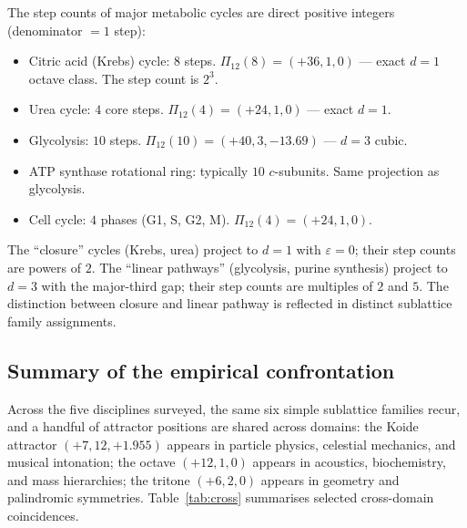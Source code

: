 \documentclass[11pt,a4paper]{article}
\theoremstyle{definition}
\theoremstyle{remark}
\newcommand{\eps}{\varepsilon}
\begin{document}
The step counts of major metabolic cycles are direct positive integers (denominator $=1$ step):
\begin{itemize}[leftmargin=*]
\item Citric acid (Krebs) cycle: $8$ steps. $\Pi_{12}(8) = (+36, 1, 0)$ --- exact $d=1$ octave class. The step count is $2^{3}$.
\item Urea cycle: $4$ core steps. $\Pi_{12}(4) = (+24, 1, 0)$ --- exact $d=1$.
\item Glycolysis: $10$ steps. $\Pi_{12}(10) = (+40, 3, -13.69)$ --- $d=3$ cubic.
\item ATP synthase rotational ring: typically $10$ $c$-subunits. Same projection as glycolysis.
\item Cell cycle: $4$ phases (G1, S, G2, M). $\Pi_{12}(4) = (+24, 1, 0)$.
\end{itemize}

The ``closure'' cycles (Krebs, urea) project to $d=1$ with $\eps=0$; their step counts are powers of $2$. The ``linear pathways'' (glycolysis, purine synthesis) project to $d=3$ with the major-third gap; their step counts are multiples of $2$ and $5$. The distinction between closure and linear pathway is reflected in distinct sublattice family assignments.

\subsection{Summary of the empirical confrontation}

Across the five disciplines surveyed, the same six simple sublattice families recur, and a handful of attractor positions are shared across domains: the Koide attractor $(+7,12,+1.955)$ appears in particle physics, celestial mechanics, and musical intonation; the octave $(+12,1,0)$ appears in acoustics, biochemistry, and mass hierarchies; the tritone $(+6,2,0)$ appears in geometry and palindromic symmetries. Table~\ref{tab:cross} summarises selected cross-domain coincidences.
\end{document}
